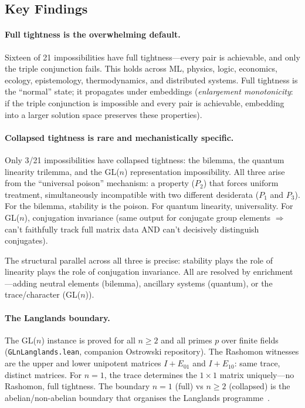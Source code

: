 \documentclass[11pt,a4paper]{article}
\begin{document}
\subsection{Key Findings}

\paragraph{Full tightness is the overwhelming default.}
Sixteen of 21 impossibilities have full tightness---every pair is achievable, and only the triple conjunction fails.  This holds across ML, physics, logic, economics, ecology, epistemology, thermodynamics, and distributed systems.  Full tightness is the ``normal'' state; it propagates under embeddings (\emph{enlargement monotonicity}: if the triple conjunction is impossible and every pair is achievable, embedding into a larger solution space preserves these properties).

\paragraph{Collapsed tightness is rare and mechanistically specific.}
Only 3/21 impossibilities have collapsed tightness: the bilemma, the quantum linearity trilemma, and the GL($n$) representation impossibility.  All three arise from the ``universal poison'' mechanism: a property ($P_2$) that forces uniform treatment, simultaneously incompatible with two different desiderata ($P_1$ and $P_3$).  For the bilemma, stability is the poison.  For quantum linearity, universality.  For GL($n$), conjugation invariance (same output for conjugate group elements $\Rightarrow$ can't faithfully track full matrix data AND can't decisively distinguish conjugates).

The structural parallel across all three is precise: stability plays the role of linearity plays the role of conjugation invariance.  All are resolved by enrichment---adding neutral elements (bilemma), ancillary systems (quantum), or the trace/character (GL($n$)).

\paragraph{The Langlands boundary.}
The GL($n$) instance is proved for all $n \geq 2$ and all primes $p$ over finite fields (\texttt{GLnLanglands.lean}, companion Ostrowski repository).  The Rashomon witnesses are the upper and lower unipotent matrices $I + E_{01}$ and $I + E_{10}$: same trace, distinct matrices.  For $n = 1$, the trace determines the $1 \times 1$ matrix uniquely---no Rashomon, full tightness.  The boundary $n = 1$ (full) vs $n \geq 2$ (collapsed) is the abelian/non-abelian boundary that organises the Langlands programme~\citep{langlands1970problems}.
\end{document}
